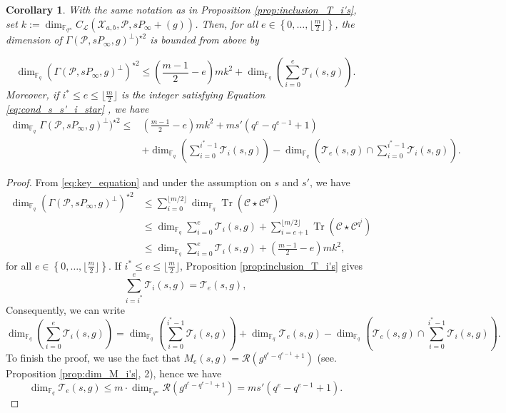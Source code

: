 \documentclass[lettersize,journal]{IEEEtran}
\theoremstyle{plain}
\newtheorem{coro}[thm]{Corollary}
\theoremstyle{definition}
\theoremstyle{remark}
\DeclareMathOperator{\trace}{Tr}
\newcommand{\calP}{\mathcal{P}}
\newcommand{\calL}{\mathcal{L}}
\newcommand{\calC}{\mathcal{C}}
\newcommand{\calR}{\mathcal{R}}
\newcommand{\calT}{\mathcal{T}}
\newcommand{\calX}{\mathcal{X}}
\newcommand{\fqm}{\mathbb{F}_{q^m}}
\newcommand{\fq}{\mathbb{F}_{q}}
\newcommand{\Tr}[1]{\trace\!\left(#1\right)}
\newcommand{\set}[1]{\left\{#1\right\}}
\begin{document}
	\begin{coro} \label{coro:folklore_upper_bound}
		With the same notation as in Proposition \ref{prop:inclusion_T_i's}, set $k:=\dim_{\fqm}C_{\calL}(\calX_{a,b},\calP,sP_\infty+(g))$.
		Then, for all $e \in \set{0,\dots,\lfloor \frac{m}{2} \rfloor}$, the dimension of $\Gamma(\calP,sP_\infty,g)^{\perp})^{\star 2}$ is bounded from above by
		
		\[\dim_{\fq} \left(\Gamma(\calP,sP_\infty,g)^{\perp}\right)^{\star 2} \leq   \left(\frac{m-1}{2}-e\right)mk^2+\dim_{\fq}\left(\sum\limits_{i=0}^e \calT_i(s,g) \right). \]
		Moreover, if $i^* \leq e \leq \lfloor \frac{m}{2} \rfloor$ is the integer satisfying Equation \eqref{eq:cond_s_s'_i_star} , we have 
		\begin{align*}
			\dim_{\fq} \Gamma(\calP,sP_\infty,g)^{\perp})^{\star 2} \leq   & \left(\frac{m-1}{2}-e\right)mk^2 + ms'(q^e-q^{e-1}+1) \\
			& + \dim_{\fq}\left(\sum\limits_{i=0}^{i^*-1} \calT_i(s,g)\right) - \dim_{\fq} \left( \calT_e(s,g) \cap   \sum\limits_{i=0}^{i^*-1} \calT_i(s,g)\right).
		\end{align*}
		
	\end{coro}
	
	\begin{proof}
		From \eqref{eq:key_equation} and under the assumption on $s$ and $s'$, we have
		\begin{align*}
			\dim_{\fq}\left(\Gamma(\calP,sP_\infty,g)^{\perp}\right)^{\star 2}
			& \leq \sum\limits_{i=0}^{\lfloor m/2 \rfloor} \dim_{\fq} \Tr{\calC \star                     \calC^{q^i}} \\
			& \leq \dim_{\fq} \sum\limits_{i=0}^{e}\calT_i(s,g) + \sum\limits_{i=e+1}^{\lfloor m/2 \rfloor} \Tr{\calC \star \calC^{q^i}} \\
			& \leq \dim_{\fq} \sum\limits_{i=0}^{e}\calT_i(s,g) + \left( \frac{m-1}{2} -e \right)mk^2,
		\end{align*}
		for all $e \in \set{0,\dots,\lfloor \frac{m}{2} \rfloor}$. If $i^* \leq e \leq \lfloor \frac{m}{2} \rfloor$,  Proposition \ref{prop:inclusion_T_i's} gives
		\[\sum\limits_{i=i^*}^e \calT_i(s,g) = \calT_e(s,g),\]
		Consequently, we can write 
		$$\dim_{\fq} \left(\sum\limits_{i=0}^{e}\calT_i(s,g)\right) = \dim_{\fq} \left(\sum\limits_{i=0}^{i^*-1}\calT_i(s,g)\right) + \dim_{\fq}\calT_e(s,g) - \dim_{\fq} \left( \calT_e(s,g) \cap   \sum\limits_{i=0}^{i^*-1} \calT_i(s,g)\right).$$
		To finish the proof, we use the fact that $M_e(s,g) = \calR\left(g^{q^e-q^{e-1}+1}\right)$ (see. Proposition \ref{prop:dim_M_i's}, 2), hence we have 
		$$\dim_{\fq}\calT_e(s,g) \leq m \cdot \dim_{\fqm} \calR\left(g^{q^e-q^{e-1}+1}\right) = m s' (q^e-q^{e-1}+1).$$
	\end{proof}
	
\end{document}
